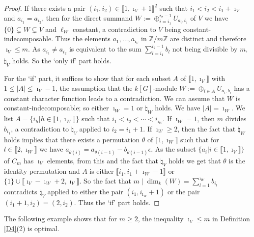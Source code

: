 \documentclass[11pt]{amsart}
\begin{document}
\begin{proof}
If there exists a pair $(i_1,i_2)\in\llbracket1,\imath_V+1\rrbracket^2$ such that $i_1<i_2<i_1+\imath_V$ and $a_{i_1}=a_{i_2}$, then for the direct summand $W:=\oplus_{i=i_1}^{i_2-1} U_{a_i,b_i}$ of $V$ we have $\{0\}\subsetneq W\subsetneq V$ and $\ell_W$ constant, a contradiction to $V$ being constant-indecomposable. Thus the elements $a_1,\ldots,a_{\imath_V}$ in $\mathbb Z/m\mathbb Z$ are distinct and therefore $\imath_V\le m$. As $a_{i_1}\neq a_{i_2}$ is equivalent to the sum $\sum_{l=i_1}^{l_2-1} b_l$ not being divisible by $m$, $\natural_V$ holds. So the  `only if' part holds.

For the `if' part, it suffices to show that for each subset $A$ of $\llbracket1,\imath_V\rrbracket$ with $1\le |A|\le \imath_V-1$, the assumption that the $k[G]$-module $W:=\oplus_{i\in A} U_{a_i,b_i}$ has a constant character function leads to a contradiction. We can assume that $W$ is constant-indecomposable; so either $\imath_W=1$ or $\natural_W$ holds. We have $|A|=\imath_W$. We list $A=\{i_h|h\in\llbracket1,\imath_W\rrbracket\}$ such that $i_1<i_2<\cdots<i_{\imath_W}$. 
If $\imath_W=1$, then $m$ divides $b_{i_1}$, a contradiction to $\natural_V$ applied to $i_2=i_1+1$. If $\imath_W\ge 2$, then the fact that $\natural_W$ holds implies that there exists a permutation $\theta$ of $\llbracket1,\imath_W\rrbracket$ such that for $l\in\llbracket2,\imath_W\rrbracket$ we have $a_{\theta(i)}=a_{\theta(i-1)}-b_{\theta(i-1)}\epsilon$. As the subset $\{a_i|i\in\llbracket1,\imath_V\rrbracket\}$ of $C_m$ has $\imath_V$ elements, from this and the fact that $\natural_V$ holds we get that $\theta$ is the identity permutation and $A$ is either $\llbracket i_1,i_1+\imath_W-1\rrbracket$ or $\{1\}\cup\llbracket\imath_V-\imath_W+2,\imath_V\rrbracket$. So the fact that $m\mid\dim_k(W)=\sum_{l=1}^{\imath_W} b_{i_l}$ contradicts $\natural_V$ applied to either the pair $(i_1,i_{\imath_W}+1)$ or the pair $(i_1+1,i_2)=(2,i_2)$. Thus the `if' part holds.
\end{proof}

\smallskip
The following example shows that for $m\ge 2$, the inequality $\imath_V\le m$ in Definition \ref{D4}(2) is optimal.
\end{document}
